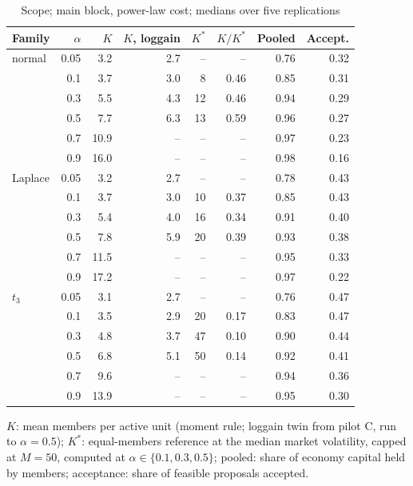 \begin{table}[htbp]
\centering
\caption{Scope; main block, power-law cost; medians over five replications}
\label{tab:scope}
\small
\begin{tabular}{lrrrrrrr}
\toprule
Family & $\alpha$ & $K$ & $K$, loggain & $K^*$ & $K/K^*$ & Pooled & Accept. \\
\midrule
normal & 0.05 & 3.2 & 2.7 & -- & -- & 0.76 & 0.32 \\
 & 0.1 & 3.7 & 3.0 & 8 & 0.46 & 0.85 & 0.31 \\
 & 0.3 & 5.5 & 4.3 & 12 & 0.46 & 0.94 & 0.29 \\
 & 0.5 & 7.7 & 6.3 & 13 & 0.59 & 0.96 & 0.27 \\
 & 0.7 & 10.9 & -- & -- & -- & 0.97 & 0.23 \\
 & 0.9 & 16.0 & -- & -- & -- & 0.98 & 0.16 \\
\midrule
Laplace & 0.05 & 3.2 & 2.7 & -- & -- & 0.78 & 0.43 \\
 & 0.1 & 3.7 & 3.0 & 10 & 0.37 & 0.85 & 0.43 \\
 & 0.3 & 5.4 & 4.0 & 16 & 0.34 & 0.91 & 0.40 \\
 & 0.5 & 7.8 & 5.9 & 20 & 0.39 & 0.93 & 0.38 \\
 & 0.7 & 11.5 & -- & -- & -- & 0.95 & 0.33 \\
 & 0.9 & 17.2 & -- & -- & -- & 0.97 & 0.22 \\
\midrule
$t_3$ & 0.05 & 3.1 & 2.7 & -- & -- & 0.76 & 0.47 \\
 & 0.1 & 3.5 & 2.9 & 20 & 0.17 & 0.83 & 0.47 \\
 & 0.3 & 4.8 & 3.7 & 47 & 0.10 & 0.90 & 0.44 \\
 & 0.5 & 6.8 & 5.1 & 50 & 0.14 & 0.92 & 0.41 \\
 & 0.7 & 9.6 & -- & -- & -- & 0.94 & 0.36 \\
 & 0.9 & 13.9 & -- & -- & -- & 0.95 & 0.30 \\
\bottomrule
\end{tabular}
\par\smallskip\begin{minipage}{0.95\linewidth}\footnotesize $K$: mean members per active unit (moment rule; loggain twin from pilot C, run to $\alpha = 0.5$); $K^*$: equal-members reference at the median market volatility, capped at $M = 50$, computed at $\alpha \in \{0.1, 0.3, 0.5\}$; pooled: share of economy capital held by members; acceptance: share of feasible proposals accepted.\end{minipage}
\end{table}
